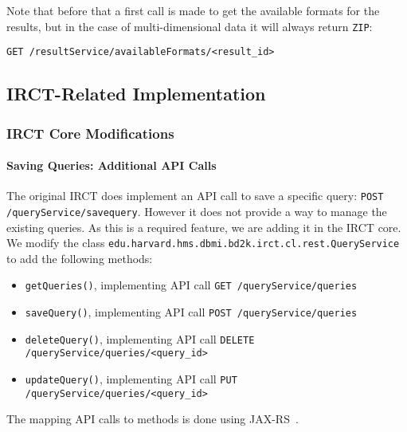 Note that before that a first call is made to get the available formats for the results, but in the case of multi-dimensional data it will always return \verb|ZIP|:
\begin{verbatim}
GET /resultService/availableFormats/<result_id>
\end{verbatim}



\subsection{IRCT-Related Implementation}

\subsubsection{IRCT Core Modifications}

\paragraph{Saving Queries: Additional API Calls}
\label{sec:irctsavedqueries}

The original IRCT does implement an API call to save a specific query: \verb|POST /queryService/savequery|.
However it does not provide a way to manage the existing queries.
As this is a required feature, we are adding it in the IRCT core.
We modify the class \verb|edu.harvard.hms.dbmi.bd2k.irct.cl.rest.QueryService| to add the following methods:
\begin{itemize}
    \item \verb|getQueries()|, implementing API call \verb|GET /queryService/queries|
    \item \verb|saveQuery()|, implementing API call \verb|POST /queryService/queries|
    \item \verb|deleteQuery()|, implementing API call \verb|DELETE /queryService/queries/<query_id>|
    \item \verb|updateQuery()|, implementing API call \verb|PUT /queryService/queries/<query_id>|
\end{itemize}

The mapping API calls to methods is done using JAX-RS~\cite{wiki:jaxrs}.

